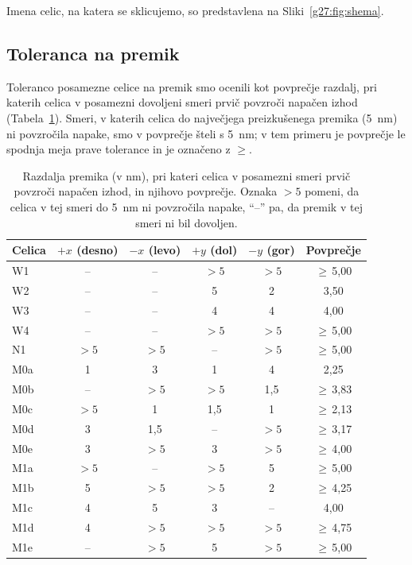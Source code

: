 Imena celic, na katera se sklicujemo, so predstavlena na Sliki~\ref{g27:fig:shema}.


\subsection{Toleranca na premik}

Toleranco posamezne celice na premik smo ocenili kot povprečje razdalj, pri katerih celica v posamezni dovoljeni smeri prvič povzroči napačen izhod (Tabela~\ref{g27:tab:toleranca}).
Smeri, v katerih celica do največjega preizkušenega premika (\SI{5}{\nano\metre}) ni povzročila napake, smo v povprečje šteli s \SI{5}{\nano\metre}; v tem primeru je povprečje le spodnja meja prave tolerance in je označeno z $\geq$.

\begin{table}[htbp]
\centering
\small
\caption{
    Razdalja premika (v \si{\nano\metre}), pri kateri celica v posamezni smeri prvič povzroči napačen izhod, in njihovo povprečje.
    Oznaka $>5$ pomeni, da celica v tej smeri do \SI{5}{\nano\metre} ni povzročila napake, \enquote{--} pa, da premik v tej smeri ni bil dovoljen.
}
\label{g27:tab:toleranca}
\begin{tabular}{lccccc}
\toprule
Celica & $+x$ (desno) & $-x$ (levo) & $+y$ (dol) & $-y$ (gor) & Povprečje \\
\midrule
W1  & --    & --    & $>5$  & $>5$  & $\geq$\,5,00 \\
W2  & --    & --    & 5     & 2     & 3,50 \\
W3  & --    & --    & 4     & 4     & 4,00 \\
W4  & --    & --    & $>5$  & $>5$  & $\geq$\,5,00 \\
\midrule
N1  & $>5$  & $>5$  & --    & $>5$  & $\geq$\,5,00 \\
\midrule
M0a & 1     & 3     & 1     & 4     & 2,25 \\
M0b & --    & $>5$  & $>5$  & 1,5   & $\geq$\,3,83 \\
M0c & $>5$  & 1     & 1,5   & 1     & $\geq$\,2,13 \\
M0d & 3     & 1,5   & --    & $>5$  & $\geq$\,3,17 \\
M0e & 3     & $>5$  & 3     & $>5$  & $\geq$\,4,00 \\
\midrule
M1a & $>5$  & --    & $>5$  & 5     & $\geq$\,5,00 \\
M1b & 5     & $>5$  & $>5$  & 2     & $\geq$\,4,25 \\
M1c & 4     & 5     & 3     & --    & 4,00 \\
M1d & 4     & $>5$  & $>5$  & $>5$  & $\geq$\,4,75 \\
M1e & --    & $>5$  & 5     & $>5$  & $\geq$\,5,00 \\
\bottomrule
\end{tabular}
\end{table}

